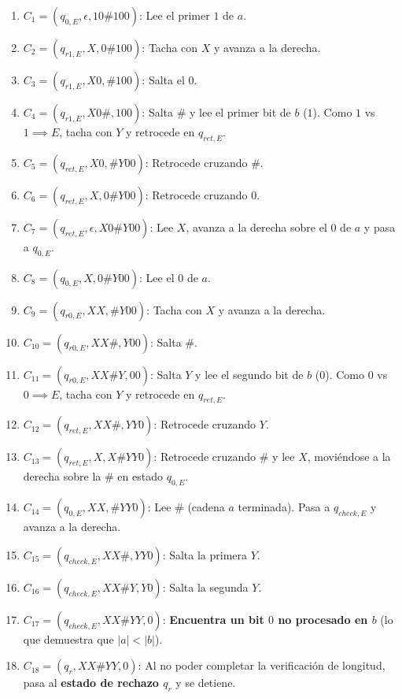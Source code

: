 \begin{enumerate}[label=\arabic*., leftmargin=*]
    \item $C_1 = (q_{0,E}, \epsilon, 10\#100)$: Lee el primer $1$ de $a$.
    \item $C_2 = (q_{r1,E}, X, 0\#100)$: Tacha con $X$ y avanza a la derecha.
    \item $C_3 = (q_{r1,E}, X0, \#100)$: Salta el $0$.
    \item $C_4 = (q_{r1,E}, X0\#, 100)$: Salta $\#$ y lee el primer bit de $b$ ($1$). Como $1$ vs $1 \implies E$, tacha con $Y$ y retrocede en $q_{ret,E}$.
    \item $C_5 = (q_{ret,E}, X0, \#Y00)$: Retrocede cruzando $\#$.
    \item $C_6 = (q_{ret,E}, X, 0\#Y00)$: Retrocede cruzando $0$.
    \item $C_7 = (q_{ret,E}, \epsilon, X0\#Y00)$: Lee $X$, avanza a la derecha sobre el $0$ de $a$ y pasa a $q_{0,E}$.
    \item $C_8 = (q_{0,E}, X, 0\#Y00)$: Lee el $0$ de $a$.
    \item $C_9 = (q_{r0,E}, XX, \#Y00)$: Tacha con $X$ y avanza a la derecha.
    \item $C_{10} = (q_{r0,E}, XX\#, Y00)$: Salta $\#$.
    \item $C_{11} = (q_{r0,E}, XX\#Y, 00)$: Salta $Y$ y lee el segundo bit de $b$ ($0$). Como $0$ vs $0 \implies E$, tacha con $Y$ y retrocede en $q_{ret,E}$.
    \item $C_{12} = (q_{ret,E}, XX\#, YY0)$: Retrocede cruzando $Y$.
    \item $C_{13} = (q_{ret,E}, X, X\#YY0)$: Retrocede cruzando $\#$ y lee $X$, moviéndose a la derecha sobre la $\#$ en estado $q_{0,E}$.
    \item $C_{14} = (q_{0,E}, XX, \#YY0)$: Lee $\#$ (cadena $a$ terminada). Pasa a $q_{check,E}$ y avanza a la derecha.
    \item $C_{15} = (q_{check,E}, XX\#, YY0)$: Salta la primera $Y$.
    \item $C_{16} = (q_{check,E}, XX\#Y, Y0)$: Salta la segunda $Y$.
    \item $C_{17} = (q_{check,E}, XX\#YY, 0)$: \textbf{Encuentra un bit $0$ no procesado en $b$} (lo que demuestra que $|a| < |b|$).
    \item $C_{18} = (q_r, XX\#YY, 0)$: Al no poder completar la verificación de longitud, pasa al \textbf{estado de rechazo $q_r$} y se detiene.
\end{enumerate}

